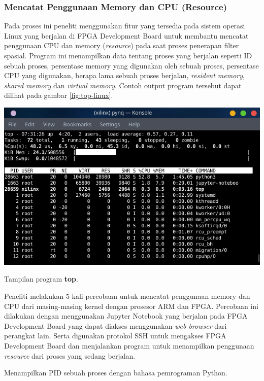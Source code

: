 \subsubsection{Mencatat Penggunaan Memory dan CPU (Resource)}
Pada proses ini peneliti menggunakan fitur yang tersedia pada sistem operasi Linux yang berjalan di FPGA Development Board untuk membantu mencatat penggunaan CPU dan memory (\textit{resource}) pada saat proses penerapan filter spasial. Program ini menampilkan data tentang proses yang berjalan seperti ID sebuah proses, persentase memory yang digunakan oleh sebuah proses, persentase CPU yang digunakan, berapa lama sebuah proses berjalan, \textit{resident memory}, \textit{shared memory} dan \textit{virtual memory}. Contoh output program tersebut dapat dilihat pada gambar \ref{fig:top-linux}.
\begin{afigure}
    \includegraphics[width=0.8\linewidth, center]{images/programs/top-linux.png}
    \caption{Tampilan program \textbf{top}.}
    \label{fig:top-linux}
\end{afigure}

Peneliti melakukan 5 kali percobaan untuk mencatat penggunaan memory dan CPU dari masing-masing kernel dengan prosesor ARM dan FPGA. Percobaan ini dilakukan dengan menggunakan Jupyter Notebook yang berjalan pada FPGA Development Board yang dapat diakses menggunakan \textit{web browser} dari perangkat lain. Serta digunakan protokol SSH untuk mengakses FPGA Development Board dan menjalankan program untuk menampilkan penggunaan \textit{resource} dari proses yang sedang berjalan.

\begin{afigure}
    
    \caption{Menampilkan PID sebuah proses dengan bahasa pemrograman Python.}
    \label{code:pid}
\end{afigure}

